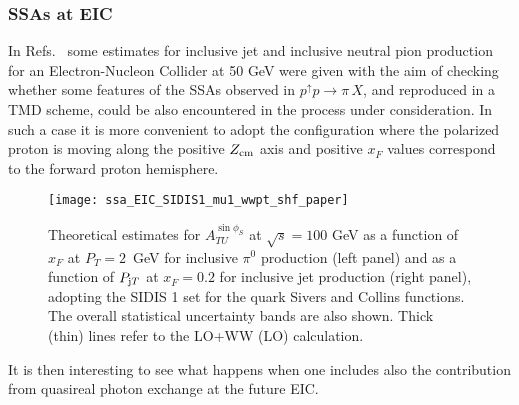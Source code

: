 \documentclass[nofootinbib,superscriptaddress,aps]{revtex4}
\begin{document}
\subsubsection{SSAs at EIC}

In Refs.~\cite{Anselmino:2009pn,Anselmino:2014eza} some estimates for inclusive jet and inclusive neutral pion production for an Electron-Nucleon Collider at 50 GeV were given with the aim of checking whether some features of the SSAs observed in $p^\uparrow p\to\pi\,X$, and reproduced in a TMD scheme, could be also encountered in the process under consideration. In such a case it is more convenient to adopt the configuration where the polarized proton is moving along the positive $Z_{\rm cm}$ axis and positive $x_F$ values correspond to the forward proton hemisphere.

\begin{figure}[ht!]
 \centering
 \texttt{[image: ssa\_EIC\_SIDIS1\_mu1\_wwpt\_shf\_paper]}
 \caption{Theoretical estimates for $A_{TU}^{\sin\phi_S}$ at $\sqrt{s}= 100$ GeV as a function of $x_F$ at $P_T = 2$~GeV for inclusive $\pi^0$ production (left panel) and as a function of $P_{{\rm j}T}$ at $x_F=0.2$  for inclusive jet production (right panel), adopting the SIDIS 1 set for the quark Sivers and Collins functions. The overall statistical uncertainty bands are also shown. Thick (thin) lines refer to the LO+WW (LO) calculation.
}
  \label{fig:SSA-eic-pi}
\end{figure}



It is then interesting to see what happens when one includes also the contribution from quasireal photon exchange at the future EIC.
\end{document}
